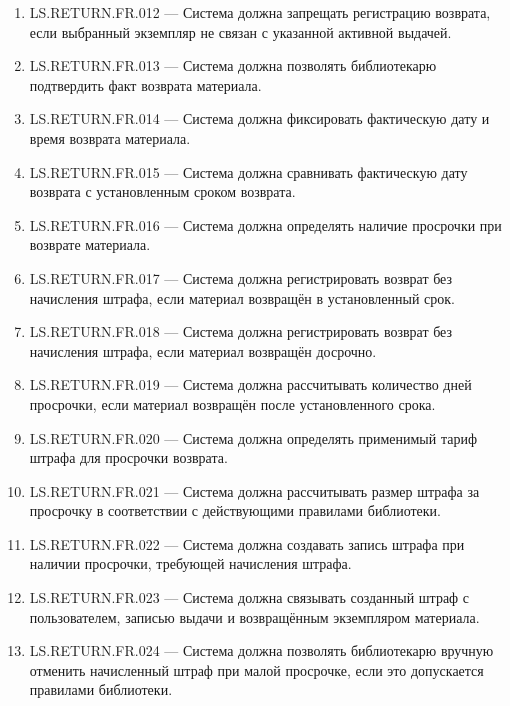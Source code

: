 \documentclass[12pt,a4paper]{article}
\begin{document}
\begin{enumerate}
		\item LS.RETURN.FR.012 --- Система должна запрещать регистрацию возврата,
		если выбранный экземпляр не связан с указанной активной выдачей.
		
		\item LS.RETURN.FR.013 --- Система должна позволять библиотекарю подтвердить
		факт возврата материала.
		
		\item LS.RETURN.FR.014 --- Система должна фиксировать фактическую дату и время
		возврата материала.
		
		\item LS.RETURN.FR.015 --- Система должна сравнивать фактическую дату возврата
		с установленным сроком возврата.
		
		\item LS.RETURN.FR.016 --- Система должна определять наличие просрочки при
		возврате материала.
		
		\item LS.RETURN.FR.017 --- Система должна регистрировать возврат без начисления
		штрафа, если материал возвращён в установленный срок.
		
		\item LS.RETURN.FR.018 --- Система должна регистрировать возврат без начисления
		штрафа, если материал возвращён досрочно.
		
		\item LS.RETURN.FR.019 --- Система должна рассчитывать количество дней просрочки,
		если материал возвращён после установленного срока.
		
		\item LS.RETURN.FR.020 --- Система должна определять применимый тариф штрафа
		для просрочки возврата.
		
		\item LS.RETURN.FR.021 --- Система должна рассчитывать размер штрафа за просрочку
		в соответствии с действующими правилами библиотеки.
		
		\item LS.RETURN.FR.022 --- Система должна создавать запись штрафа при наличии
		просрочки, требующей начисления штрафа.
		
		\item LS.RETURN.FR.023 --- Система должна связывать созданный штраф с пользователем,
		записью выдачи и возвращённым экземпляром материала.
		
		\item LS.RETURN.FR.024 --- Система должна позволять библиотекарю вручную отменить
		начисленный штраф при малой просрочке, если это допускается правилами
		библиотеки.
		

\end{enumerate}
\end{document}
